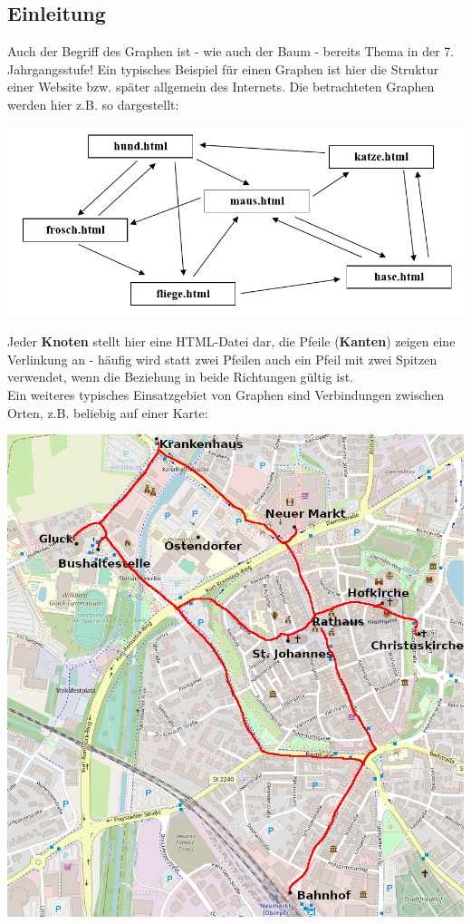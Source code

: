 \documentclass{article}
\begin{document}
\subsection{Einleitung}
Auch der Begriff des Graphen ist - wie auch der Baum - bereits Thema in der 7. Jahrgangsstufe! Ein typisches Beispiel für einen Graphen ist hier die Struktur einer Website bzw. später allgemein des Internets. Die betrachteten Graphen werden hier z.B. so dargestellt: 
\begin{center}
    \includegraphics[scale=0.5]{../media/website.png}
\end{center}
Jeder \textbf{Knoten} stellt hier eine HTML-Datei dar, die Pfeile (\textbf{Kanten}) zeigen eine Verlinkung an - häufig wird statt zwei Pfeilen auch ein Pfeil mit zwei Spitzen verwendet, wenn die Beziehung in beide Richtungen gültig ist. \\
Ein weiteres typisches Einsatzgebiet von Graphen sind Verbindungen zwischen Orten, z.B. beliebig auf einer Karte:
\begin{center}
    \includegraphics[scale=0.45]{../media/neumarkt.png}
\end{center}
\end{document}
